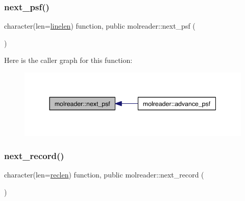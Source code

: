 \mbox{\label{namespacemolreader_ac6b85a406b7ebd0810f0d63beeeda783}} 
\subsubsection{\texorpdfstring{next\+\_\+psf()}{next\_psf()}}
{\footnotesize\ttfamily character(len=\hyperlink{namespacemolreader_acd493d996a1fcd0ed77937e925c9b7fe}{linelen}) function, public molreader\+::next\+\_\+psf (\begin{DoxyParamCaption}{ }\end{DoxyParamCaption})}

Here is the caller graph for this function\+:\nopagebreak
\begin{figure}[H]
\begin{center}
\leavevmode
\includegraphics[width=344pt]{namespacemolreader_ac6b85a406b7ebd0810f0d63beeeda783_icgraph}
\end{center}
\end{figure}
\mbox{\label{namespacemolreader_af6c857ef51f99971a66b1c293d24906b}} 
\subsubsection{\texorpdfstring{next\+\_\+record()}{next\_record()}}
{\footnotesize\ttfamily character(len=\hyperlink{namespacemolreader_a8f12be3272b946fd698c9fbaf2ba9d32}{reclen}) function, public molreader\+::next\+\_\+record (\begin{DoxyParamCaption}{ }\end{DoxyParamCaption})}

\mbox{\label{namespacemolreader_a38a3903d901bc5e0b318bcc0dfd1b3ff}} 
